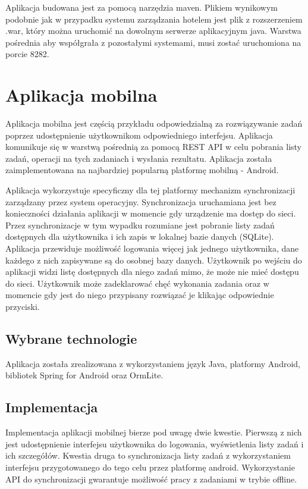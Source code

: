 Aplikacja budowana jest za pomocą narzędzia maven. Plikiem wynikowym podobnie jak w przypadku systemu zarządzania hotelem jest plik z rozszerzeniem .war, który można uruchomić na dowolnym serwerze aplikacyjnym java. Warstwa pośrednia aby współgrała z pozostałymi systemami, musi zostać uruchomiona na porcie 8282. 


\section{Aplikacja mobilna}
\label{sec:exampleMobileApp}

Aplikacja mobilna jest częścią przykładu odpowiedzialną za rozwiązywanie zadań poprzez udostępnienie użytkownikom odpowiedniego interfejsu. Aplikacja komunikuje się w warstwą pośrednią za pomocą REST API w celu pobrania listy zadań, operacji na tych zadaniach i wysłania rezultatu. Aplikacja została zaimplementowana na najbardziej popularną platformę mobilną - Android. 

Aplikacja wykorzystuje specyficzny dla tej platformy mechanizm synchronizacji zarządzany przez system operacyjny. Synchronizacja uruchamiana jest bez konieczności działania aplikacji w momencie gdy urządzenie ma dostęp do sieci. Przez synchronizacje w tym wypadku rozumiane jest pobranie listy zadań dostępnych dla użytkownika i ich zapis w lokalnej bazie danych (SQLite). Aplikacja przewiduje możliwość logowania więcej jak jednego użytkownika, dane każdego z nich zapisywane są do osobnej bazy danych. Użytkownik po wejściu do aplikacji widzi listę dostępnych dla niego zadań mimo, że może nie mieć dostępu do sieci. Użytkownik może zadeklarować chęć wykonania zadania oraz w momencie gdy jest do niego przypisany rozwiązać je klikając odpowiednie przyciski.

\subsection{Wybrane technologie}

Aplikacja została zrealizowana z wykorzystaniem język Java, platformy Android, bibliotek Spring for Android oraz OrmLite. 

\subsection{Implementacja}

Implementacja aplikacji mobilnej bierze pod uwagę dwie kwestie. Pierwszą z nich jest udostępnienie interfejsu użytkownika do logowania, wyświetlenia listy zadań i ich szczegółów. Kwestia druga to synchronizacja listy zadań z wykorzystaniem interfejsu przygotowanego do tego celu przez platformę android. Wykorzystanie API do synchronizacji gwarantuje możliwość pracy z zadaniami w trybie offline. 

